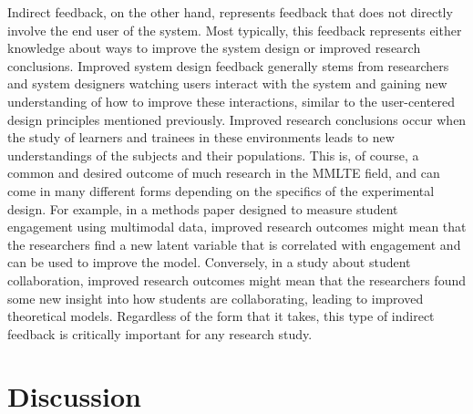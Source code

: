 \documentclass[manuscript,screen,review]{acmart}
\begin{document}
Indirect feedback, on the other hand, represents feedback that does not directly involve the end user of the system. Most typically, this feedback represents either knowledge about ways to improve the system design or improved research conclusions. Improved system design feedback generally stems from researchers and system designers watching users interact with the system and gaining new understanding of how to improve these interactions, similar to the user-centered design principles mentioned previously. Improved research conclusions occur when the study of learners and trainees in these environments leads to new understandings of the subjects and their populations. This is, of course, a common and desired outcome of much research in the MMLTE field, and can come in many different forms depending on the specifics of the experimental design. For example, in a methods paper designed to measure student engagement using multimodal data, improved research outcomes might mean that the researchers find a new latent variable that is correlated with engagement and can be used to improve the model. Conversely, in a study about student collaboration, improved research outcomes might mean that the researchers found some new insight into how students are collaborating, leading to improved theoretical models. Regardless of the form that it takes, this type of indirect feedback is critically important for any research study.


\section{Discussion} \label{sec:discussion}
\end{document}
